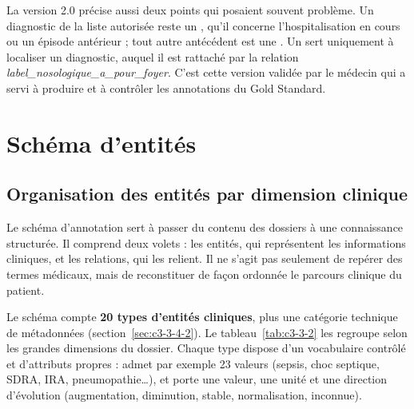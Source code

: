La version 2.0 précise aussi deux points qui posaient souvent problème. Un diagnostic de la liste autorisée reste un , qu’il concerne l’hospitalisation en cours ou un épisode antérieur ; tout autre antécédent est une . Un  sert uniquement à localiser un diagnostic, auquel il est rattaché par la relation \emph{label\_nosologique\_a\_pour\_foyer}. C’est cette version validée par le médecin qui a servi à produire et à contrôler les annotations du Gold Standard.

\section{Schéma d’entités}\label{sec:c3-3-4}

\subsection{Organisation des entités par dimension clinique}\label{sec:c3-3-4-1}

Le schéma d’annotation sert à passer du contenu des dossiers à une connaissance structurée. Il comprend deux volets : les entités, qui représentent les informations cliniques, et les relations, qui les relient. Il ne s’agit pas seulement de repérer des termes médicaux, mais de reconstituer de façon ordonnée le parcours clinique du patient.

Le schéma compte \textbf{20 types d’entités cliniques}, plus une catégorie technique de métadonnées (section~\ref{sec:c3-3-4-2}). Le tableau~\ref{tab:c3-3-2} les regroupe selon les grandes dimensions du dossier. Chaque type dispose d’un vocabulaire contrôlé et d’attributs propres :  admet par exemple 23 valeurs (sepsis, choc septique, SDRA, IRA, pneumopathie…), et  porte une valeur, une unité et une direction d’évolution (augmentation, diminution, stable, normalisation, inconnue).

